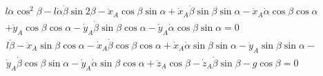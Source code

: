 \documentclass{article}
\begin{document}
\begin{multline}
l\ddot{\alpha}\cos^2\beta - l\dot{\alpha}\dot{\beta}\sin2\beta-\ddot{x}_A\cos\beta\sin\alpha + \dot{x}_A\dot{\beta}\sin\beta\sin\alpha - \dot{x}_A\dot{\alpha}\cos\beta\cos\alpha\\
+ \ddot{y}_A\cos\beta\cos\alpha - \dot{y}_A\dot{\beta}\sin\beta\cos\alpha - \dot{y}_A\dot{\alpha}\cos\beta\sin\alpha = 0
\end{multline}
\begin{multline}
	l\ddot{\beta} - \ddot{x}_A\sin\beta\cos\alpha - \dot{x}_A\dot{\beta}\cos\beta\cos\alpha+\dot{x}_A\dot{\alpha}\sin\beta\sin\alpha - \ddot{y}_A\sin\beta\sin\alpha - \\
	\dot{y}_A\dot{\beta}\cos\beta\sin\alpha - \dot{y}_A\dot{\alpha}\sin\beta\cos\alpha + \ddot{z}_A\cos\beta - \dot{z}_A\dot{\beta}\sin\beta - g\cos\beta = 0
\end{multline}
\end{document}

